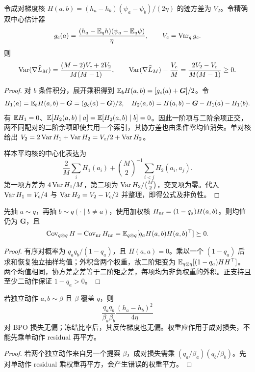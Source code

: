 \begin{theorem}[消去中心的精确方差代价]
令成对梯度核 $H(a,b)=(h_a-h_b)(\psi_a-\psi_b)/(2\eta)$ 的迹方差为 $V_2$。令精确双中心估计器
\begin{equation}
g_c(a)=\frac{(h_a-\mathbb E_qh)(\psi_a-\mathbb E_q\psi)}{\eta},
\qquad V_c=\operatorname{Var}_qg_c.
\end{equation}
则
\begin{equation}
\operatorname{Var}(\nabla\widehat L_M)
=\frac{(M-2)V_c+2V_2}{M(M-1)},\qquad
\operatorname{Var}(\nabla\widehat L_M)-\frac{V_c}{M}
=\frac{2V_2-V_c}{M(M-1)}\ge0.
\end{equation}
\end{theorem}
\begin{proof}
对 $b$ 条件积分，展开乘积得到 $\mathbb E_bH(a,b)=[g_c(a)+\bm G]/2$。令
\begin{equation}
H_1(a)=\mathbb E_bH(a,b)-\bm G=(g_c(a)-\bm G)/2,\quad
H_2(a,b)=H(a,b)-\bm G-H_1(a)-H_1(b).
\end{equation}
有 $\mathbb E H_1=0$、$\mathbb E[H_2(a,b)\mid a]=\mathbb E[H_2(a,b)\mid b]=0$。因此一阶项与二阶余项正交，两不同配对的二阶余项即使共用一个索引，其协方差也由条件零均值消失。单对核给出 $V_2=2\operatorname{Var} H_1+\operatorname{Var} H_2=V_c/2+\operatorname{Var} H_2$。

样本平均核的中心化表达为
\begin{equation}
\frac2M\sum_iH_1(a_i)+\binom M2^{-1}\sum_{i<j}H_2(a_i,a_j).
\end{equation}
第一项方差为 $4\operatorname{Var} H_1/M$，第二项为 $\operatorname{Var} H_2/\binom M2$，交叉项为零。代入 $\operatorname{Var} H_1=V_c/4$ 与 $\operatorname{Var} H_2=V_2-V_c/2$ 并整理，即得公式及非负性。
\end{proof}

\begin{proposition}[排除重复动作的半正定改进]
先抽 $a\sim q$，再抽 $b\sim q(\cdot\mid b\ne a)$，使用加权核 $H_{\rm nr}=(1-q_a)H(a,b)$。则均值仍为 $\bm G$，且
\begin{equation}
\operatorname{Cov}_{q\otimes q}H-\operatorname{Cov}_{\rm nr}H_{\rm nr}
=\mathbb E_{q\otimes q}[q_aH(a,b)H(a,b)^\top]\succeq0.
\end{equation}
\end{proposition}
\begin{proof}
有序对概率为 $q_aq_b/(1-q_a)$，且 $H(a,a)=0$。乘以一个 $(1-q_a)$ 后求和恢复独立抽样均值；外积含两个权重，故二阶矩变为 $\mathbb E_{q\otimes q}[(1-q_a)HH^\top]$。两个均值相同，协方差之差等于二阶矩之差，每项均为非负权重的外积。正支持且至少二动作保证 $1-q_a>0$。
\end{proof}

\begin{proposition}
若独立动作 $a,b\sim\beta$ 且 $\beta$ 覆盖 $q$，则
\begin{equation}
\frac{q_aq_b}{\beta_a\beta_b}\frac{(h_a-h_b)^2}{4\eta}
\end{equation}
对 BPO 损失无偏；冻结比率后，其反传梯度也无偏。权重应作用于成对损失，不能先乘单动作 residual 再平方。
\end{proposition}
\begin{proof}
若两个独立动作来自另一个提案 $\beta$，成对损失需乘 $(q_a/\beta_a)(q_b/\beta_b)$。先对单动作 residual 乘权重再平方，会产生错误的权重平方。
\end{proof}

